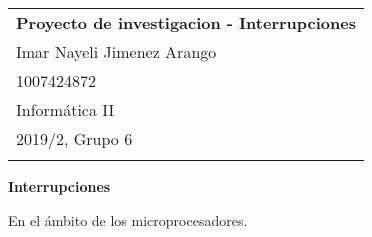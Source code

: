 \documentclass[a4paper,12pt]{article}
\begin{document}
\thispagestyle{empty}  

\begin{tabular}{p{15.5cm}}  
{\large \bf Proyecto de investigacion - Interrupciones} \\ Imar Nayeli Jimenez Arango \\ 1007424872\\ Informática II   \\ 2019/2, Grupo 6\\
\hline %
\\
\end{tabular} %

\vspace*{0.3cm} %

\begin{center} %
	{\Large \bf Interrupciones} %
	\vspace{2mm}
	
		
\end{center}  

\vspace{0.4cm}



En el ámbito de los microprocesadores. 
\end{document}
